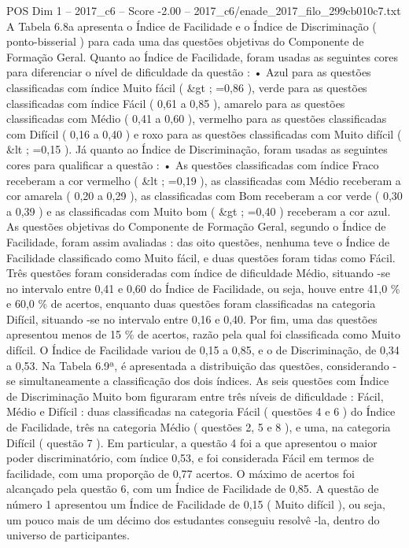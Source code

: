 \begin{textsample}{POS Dim 1 – 2017\_c6 – Score -2.00 – 2017\_c6/enade\_2017\_filo\_299cb010c7.txt}
A Tabela 6.8a apresenta o Índice de Facilidade e o Índice de Discriminação ( ponto-bisserial ) para cada uma das questões objetivas do Componente de Formação Geral.
Quanto ao Índice de Facilidade, foram usadas as seguintes cores para diferenciar o nível de dificuldade da questão : • Azul para as questões classificadas com índice Muito fácil ( \&gt ; =0,86 ), verde para as questões classificadas com índice Fácil ( 0,61 a 0,85 ), amarelo para as questões classificadas com Médio ( 0,41 a 0,60 ), vermelho para as questões classificadas com Difícil ( 0,16 a 0,40 ) e roxo para as questões classificadas com Muito difícil ( \&lt ; =0,15 ).
Já quanto ao Índice de Discriminação, foram usadas as seguintes cores para qualificar a questão : • As questões classificadas com índice Fraco receberam a cor vermelho ( \&lt ; =0,19 ), as classificadas com Médio receberam a cor amarela ( 0,20 a 0,29 ), as classificadas com Bom receberam a cor verde ( 0,30 a 0,39 ) e as classificadas com Muito bom ( \&gt ; =0,40 ) receberam a cor azul.
As questões objetivas do Componente de Formação Geral, segundo o Índice de Facilidade, foram assim avaliadas : das oito questões, nenhuma teve o Índice de Facilidade classificado como Muito fácil, e duas questões foram tidas como Fácil.
Três questões foram consideradas com índice de dificuldade Médio, situando -se no intervalo entre 0,41 e 0,60 do Índice de Facilidade, ou seja, houve entre 41,0 \% e 60,0 \% de acertos, enquanto duas questões foram classificadas na categoria Difícil, situando -se no intervalo entre 0,16 e 0,40.
Por fim, uma das questões apresentou menos de 15 \% de acertos, razão pela qual foi classificada como Muito difícil.
O Índice de Facilidade variou de 0,15 a 0,85, e o de Discriminação, de 0,34 a 0,53.
Na Tabela 6.9ª, é apresentada a distribuição das questões, considerando -se simultaneamente a classificação dos dois índices.
As seis questões com Índice de Discriminação Muito bom figuraram entre três níveis de dificuldade : Fácil, Médio e Difícil : duas classificadas na categoria Fácil ( questões 4 e 6 ) do Índice de Facilidade, três na categoria Médio ( questões 2, 5 e 8 ), e uma, na categoria Difícil ( questão 7 ).
Em particular, a questão 4 foi a que apresentou o maior poder discriminatório, com índice 0,53, e foi considerada Fácil em termos de facilidade, com uma proporção de 0,77 acertos.
O máximo de acertos foi alcançado pela questão 6, com um Índice de Facilidade de 0,85.
A questão de número 1 apresentou um Índice de Facilidade de 0,15 ( Muito difícil ), ou seja, um pouco mais de um décimo dos estudantes conseguiu resolvê -la, dentro do universo de participantes.

\end{textsample}
